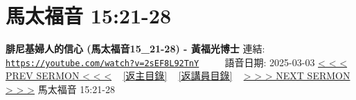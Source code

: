 \documentclass{book}
\begin{document}
\section{馬太福音 15:21-28}
\label{sec:2sEF8L92TnY}
\textbf{腓尼基婦人的信心 (馬太福音15\_21-28) - 黃福光博士}
\newline
\newline
連結: \href{https://youtube.com/watch?v=2sEF8L92TnY}{\texttt{https://youtube.com/watch?v=2sEF8L92TnY}} ~~~~ 語音日期: 2025-03-03
\newline
\newline
\hyperref[sec:lTGVgidxHms]{< < < PREV SERMON < < <}
~
\hyperlink{toc}{[返主目錄]}
~
\hyperref[ch:preacher15]{[返講員目錄]}
~
\hyperref[sec:g49XieTOO9Y]{> > > NEXT SERMON > > >}
\newline
\newline
馬太福音 15:21-28
\newline
\end{document}
